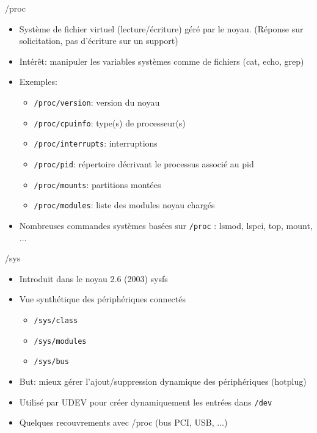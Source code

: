 \begin{frame}{/proc}
  \begin{itemize}
  \item Système de fichier virtuel (lecture/écriture) géré par le noyau. (Réponse sur solicitation, pas d'écriture sur un support)
  \item Intérêt: manipuler les variables systèmes comme de fichiers (cat, echo, grep)
  \item Exemples:
    \begin{itemize}
    \item \texttt{/proc/version}: version du noyau
    \item \texttt{/proc/cpuinfo}: type(s) de processeur(s)
    \item \texttt{/proc/interrupts}: interruptions
    \item \texttt{/proc/pid}: répertoire décrivant le processus associé au pid
    \item \texttt{/proc/mounts}: partitions montées
    \item \texttt{/proc/modules}: liste des modules noyau chargés
    \end{itemize}
  \item Nombreuses commandes systèmes basées sur \texttt{/proc} : lsmod, lspci, top, mount, ...
  \end{itemize}
\end{frame}

\begin{frame}{/sys}
  \begin{itemize}
  \item Introduit dans le noyau 2.6 (2003) \MVRightarrow{} sysfs
  \item Vue synthétique des périphériques connectés
    \begin{itemize}
    \item \texttt{/sys/class}
    \item \texttt{/sys/modules}
    \item \texttt{/sys/bus}
    \end{itemize}
  \item But: mieux gérer l'ajout/suppression dynamique des périphériques (hotplug)
  \item Utilisé par UDEV pour créer dynamiquement les entrées dans \texttt{/dev}
  \item Quelques recouvrements avec /proc (bus PCI, USB, ...)
  \end{itemize}
\end{frame}

